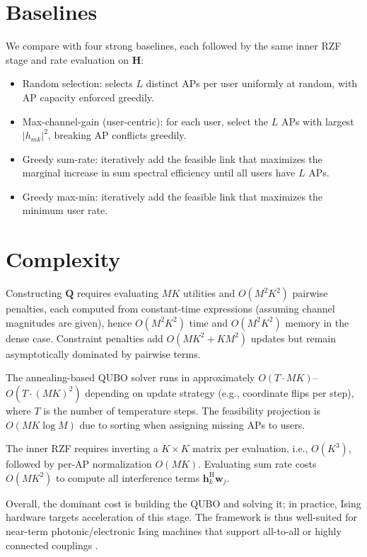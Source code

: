 \section{Baselines}
We compare with four strong baselines, each followed by the same inner RZF stage and rate evaluation on $\mathbf{H}$:
\begin{itemize}
\item Random selection: selects $L$ distinct APs per user uniformly at random, with AP capacity enforced greedily.
\item Max-channel-gain (user-centric): for each user, select the $L$ APs with largest $|h_{mk}|^2$, breaking AP conflicts greedily.
\item Greedy sum-rate: iteratively add the feasible link that maximizes the marginal increase in sum spectral efficiency until all users have $L$ APs.
\item Greedy max-min: iteratively add the feasible link that maximizes the minimum user rate.
\end{itemize}

\section{Complexity}
Constructing $\mathbf{Q}$ requires evaluating $MK$ utilities and $O(M^2K^2)$ pairwise penalties, each computed from constant-time expressions (assuming channel magnitudes are given), hence $O(M^2K^2)$ time and $O(M^2K^2)$ memory in the dense case. Constraint penalties add $O(MK^2+KM^2)$ updates but remain asymptotically dominated by pairwise terms.

The annealing-based QUBO solver runs in approximately $O(T\cdot MK)$–$O(T\cdot (MK)^2)$ depending on update strategy (e.g., coordinate flips per step), where $T$ is the number of temperature steps. The feasibility projection is $O(MK\log M)$ due to sorting when assigning missing APs to users.

The inner RZF requires inverting a $K\times K$ matrix per evaluation, i.e., $O(K^3)$, followed by per-AP normalization $O(MK)$. Evaluating sum rate costs $O(MK^2)$ to compute all interference terms $\mathbf{h}_k^\mathrm{H}\mathbf{w}_j$.

Overall, the dominant cost is building the QUBO and solving it; in practice, Ising hardware targets acceleration of this stage. The framework is thus well-suited for near-term photonic/electronic Ising machines that support all-to-all or highly connected couplings \cite{mcmahon2016fully,inagaki2016coherent}.

